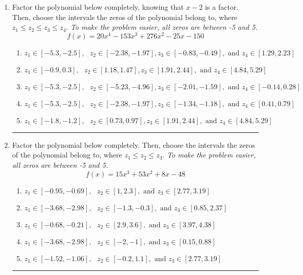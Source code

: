 \documentclass[14pt]{extbook}
\newcommand{\litem}[1]{\item#1\hspace*{-1cm}\rule{\textwidth}{0.4pt}}
\begin{document}
\begin{enumerate}
{\begin{enumerate}[label=\Alph*.]
\end{enumerate} }
\litem{
Factor the polynomial below completely, knowing that $x-2$ is a factor. Then, choose the intervals the zeros of the polynomial belong to, where $z_1 \leq z_2 \leq z_3 \leq z_4$. \textit{To make the problem easier, all zeros are between -5 and 5.}\[ f(x) = 20x^{4} -153 x^{3} +276 x^{2} -25 x -150 \]\begin{enumerate}[label=\Alph*.]
\item \( z_1 \in [-5.3, -2.5], \text{   }  z_2 \in [-2.38, -1.97], z_3 \in [-0.83, -0.49], \text{   and   } z_4 \in [1.29, 2.23] \)
\item \( z_1 \in [-0.9, 0.3], \text{   }  z_2 \in [1.18, 1.47], z_3 \in [1.91, 2.44], \text{   and   } z_4 \in [4.84, 5.29] \)
\item \( z_1 \in [-5.3, -2.5], \text{   }  z_2 \in [-5.23, -4.96], z_3 \in [-2.01, -1.59], \text{   and   } z_4 \in [-0.14, 0.28] \)
\item \( z_1 \in [-5.3, -2.5], \text{   }  z_2 \in [-2.38, -1.97], z_3 \in [-1.34, -1.18], \text{   and   } z_4 \in [0.41, 0.79] \)
\item \( z_1 \in [-1.8, -1.2], \text{   }  z_2 \in [0.73, 0.97], z_3 \in [1.91, 2.44], \text{   and   } z_4 \in [4.84, 5.29] \)

\end{enumerate} }
\litem{
Factor the polynomial below completely. Then, choose the intervals the zeros of the polynomial belong to, where $z_1 \leq z_2 \leq z_3$. \textit{To make the problem easier, all zeros are between -5 and 5.}\[ f(x) = 15x^{3} +53 x^{2} +8 x -48 \]\begin{enumerate}[label=\Alph*.]
\item \( z_1 \in [-0.95, -0.69], \text{   }  z_2 \in [1, 2.3], \text{   and   } z_3 \in [2.77, 3.19] \)
\item \( z_1 \in [-3.68, -2.98], \text{   }  z_2 \in [-1.3, -0.3], \text{   and   } z_3 \in [0.85, 2.37] \)
\item \( z_1 \in [-0.68, -0.21], \text{   }  z_2 \in [2.9, 3.6], \text{   and   } z_3 \in [3.97, 4.38] \)
\item \( z_1 \in [-3.68, -2.98], \text{   }  z_2 \in [-2, -1], \text{   and   } z_3 \in [0.15, 0.88] \)
\item \( z_1 \in [-1.52, -1.06], \text{   }  z_2 \in [-0.2, 1.1], \text{   and   } z_3 \in [2.77, 3.19] \)

\end{enumerate} }
\end{enumerate}
\end{document}
